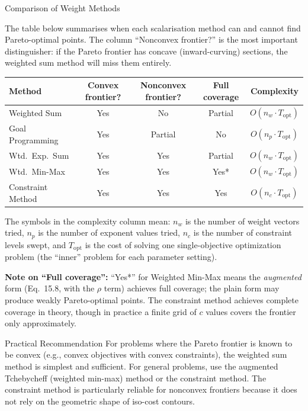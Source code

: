 \documentclass[aspectratio=169,10pt]{beamer}
\begin{document}
\begin{frame}[allowframebreaks]{Comparison of Weight Methods}

The table below summarises when each scalarisation method can and cannot
find Pareto-optimal points.  The column ``Nonconvex frontier?'' is the most
important distinguisher: if the Pareto frontier has concave (inward-curving)
sections, the weighted sum method will miss them entirely.

\begin{center}
\begin{tabular}{lcccc}
\toprule
\textbf{Method} & \textbf{Convex frontier?} & \textbf{Nonconvex frontier?} & \textbf{Full coverage} & \textbf{Complexity} \\
\midrule
Weighted Sum         & Yes & No         & Partial & $O(n_w \cdot T_{\text{opt}})$ \\
Goal Programming     & Yes & Partial    & No      & $O(n_p \cdot T_{\text{opt}})$ \\
Wtd.\ Exp.\ Sum     & Yes & Yes        & Partial & $O(n_w \cdot T_{\text{opt}})$ \\
Wtd.\ Min-Max        & Yes & Yes        & Yes*    & $O(n_w \cdot T_{\text{opt}})$ \\
Constraint Method    & Yes & Yes        & Yes     & $O(n_c \cdot T_{\text{opt}})$ \\
\bottomrule
\end{tabular}
\end{center}

The symbols in the complexity column mean: $n_w$ is the number of weight
vectors tried, $n_p$ is the number of exponent values tried, $n_c$ is the
number of constraint levels swept, and $T_{\text{opt}}$ is the cost of
solving one single-objective optimization problem (the ``inner'' problem for
each parameter setting).

\textbf{Note on ``Full coverage'':}  ``Yes*'' for Weighted Min-Max means the
\emph{augmented} form (Eq.~15.8, with the $\rho$ term) achieves full coverage;
the plain form may produce weakly Pareto-optimal points.  The constraint method
achieves complete coverage in theory, though in practice a finite grid of
$c$ values covers the frontier only approximately.

\begin{alertblock}{Practical Recommendation}
  For problems where the Pareto frontier is known to be convex (e.g., convex
  objectives with convex constraints), the weighted sum method is simplest and
  sufficient.  For general problems, use the augmented Tchebycheff (weighted
  min-max) method or the constraint method.  The constraint method is
  particularly reliable for nonconvex frontiers because it does not rely on
  the geometric shape of iso-cost contours.
\end{alertblock}

\end{frame}
\end{document}
